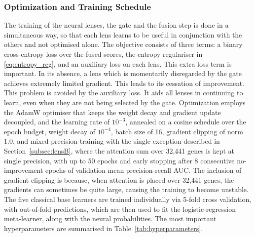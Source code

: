 \documentclass[journal]{IEEEtran}
\begin{document}
\subsubsection{Optimization and Training Schedule}
The training of the neural lenses, the gate and the fusion step is done in a
simultaneous way, so that each lens learns to be useful in conjunction with the
others and not optimised alone. The objective consists of three terms: a binary
cross-entropy loss over the fused scores, the entropy regulariser in
\eqref{eq:entropy_reg}, and an auxiliary loss on each lens. This extra loss
term is important. In its absence, a lens which is momentarily disregarded by the
gate achieves extremely limited gradient. This leads to its cessation of improvement.
This problem is avoided by the auxiliary loss. It aids all lenses in continuing to
learn, even when they are not being selected by the gate. Optimization employs the
AdamW optimiser that keeps the weight decay and gradient update decoupled, and the
learning rate of $10^{-3}$, annealed on a cosine schedule over the epoch budget,
weight decay of $10^{-4}$, batch size of 16, gradient clipping of norm 1.0, and
mixed-precision training with the single exception described in
Section~\ref{subsec:lensB}, where the attention sum over 32{,}441 genes is kept at
single precision, with up to 50 epochs and early stopping after 8 consecutive
no-improvement epochs of validation mean precision-recall AUC. The inclusion of
gradient clipping is because, when attention is placed over 32{,}441 genes, the
gradients can sometimes be quite large, causing the training to become unstable. The
five classical base learners are trained individually via 5-fold cross validation,
with out-of-fold predictions, which are then used to fit the logistic-regression
meta-learner, along with the neural probabilities. The most important hyperparameters
are summarised in Table~\ref{tab:hyperparameters}.
\end{document}
